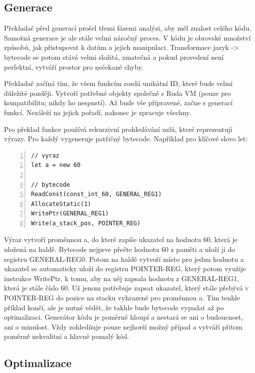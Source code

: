 \documentclass[12pt, a4paper,
twoside,        %
openright
]{report}
\begin{document}
\subsection{Generace}

Překladač před generací prošel třemi fázemi analýzi, aby měl znalost celého kódu. Samotná generace je ale stále velmi náročný proces. V kódu je obrovské množství způsobů, jak přistupovat k datům a jejich manipulaci. Transformace jazyk -> bytecode se potom stává velmi složitá, zmatečná a pokud provedení není perfektní, vytváří prostor pro nečekané chyby.

Překladač začíná tím, že všem funkcím rozdá unikátní ID, které bude velmi důležité později. Vytvoří potřebné objekty společně s Ruda VM (pouze pro kompatibilitu; nikdy ho nespustí). Až bude vše připravené, začne s generací funkcí. Nezáleží na jejich pořadí, nakonec je zpracuje všechny.

Pro překlad funkce používá rekurzivní prohledávání uzlů, které reprezentují výrazy. Pro každý vygeneruje patřičný bytecode. Například pro klíčové slovo let:

\begin{lstlisting}[numbers=left, caption={Překlad klíčového slova let}]
// vyraz
let a = new 60

// bytecode
ReadConst(const_int_60, GENERAL_REG1)
AllocateStatic(1)     
WritePtr(GENERAL_REG1)   
Write(a_stack_pos, POINTER_REG)  
\end{lstlisting}

Výraz vytvoří proměnnou a, do které zapíše ukazatel na hodnotu 60, která je uložená na haldě. Bytecode nejprve přečte hodnotu 60 z paměti a uloží ji do registru GENERAL-REG0. Potom na haldě vytvoří místo pro jednu hodnotu a ukazatel se automaticky uloží do registru POINTER-REG, který potom využije instrukce WritePtr, k tomu, aby na něj zapsala hodnotu z GENERAL-REG1, která je stále číslo 60. Už jenom potřebuje zapsat ukazatel, který stále přebývá v POINTER-REG do pozice na stacku vyhrazené pro proměnnou a. Tím tenhle příklad končí, ale je nutné vědět, že takhle bude bytecode vypadat až po optimalizaci. Generátor kódu je poměrně hloupí a nestará se ani o budoucnost, ani o minulost. Vždy zohledňuje pouze nejhorší možný případ a vytváří přitom poměrně nekvalitní a hlavně pomalý kód.


\subsection{Optimalizace}
\end{document}
